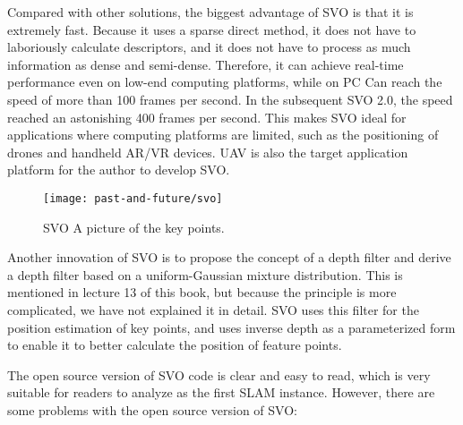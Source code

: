 Compared with other solutions, the biggest advantage of SVO is that it is extremely fast. Because it uses a sparse direct method, it does not have to laboriously calculate descriptors, and it does not have to process as much information as dense and semi-dense. Therefore, it can achieve real-time performance even on low-end computing platforms, while on PC Can reach the speed of more than 100 frames per second. In the subsequent SVO 2.0, the speed reached an astonishing 400 frames per second. This makes SVO ideal for applications where computing platforms are limited, such as the positioning of drones and handheld AR/VR devices. UAV is also the target application platform for the author to develop SVO.

\begin{figure}[H]
\centering
\texttt{[image: past-and-future/svo]}
\caption{SVO A picture of the key points. }
\label{fig: svo}
\end{figure}

Another innovation of SVO is to propose the concept of a depth filter and derive a depth filter based on a uniform-Gaussian mixture distribution. This is mentioned in lecture 13 of this book, but because the principle is more complicated, we have not explained it in detail. SVO uses this filter for the position estimation of key points, and uses inverse depth as a parameterized form to enable it to better calculate the position of feature points.

The open source version of SVO code is clear and easy to read, which is very suitable for readers to analyze as the first SLAM instance. However, there are some problems with the open source version of SVO:

